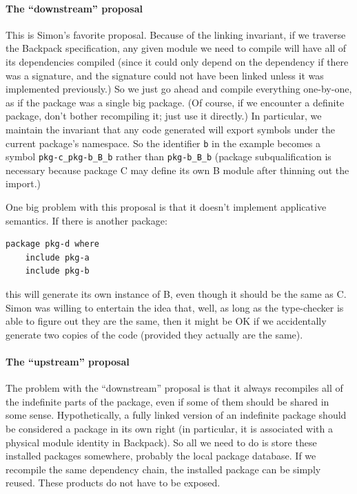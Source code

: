 \documentclass{article}
\begin{document}
\paragraph{The ``downstream'' proposal}  This is Simon's favorite
proposal.  Because of the linking invariant, if we traverse the Backpack
specification, any given module we need to compile will have all of its
dependencies compiled (since it could only depend on the dependency if
there was a signature, and the signature could not have been linked
unless it was implemented previously.)  So we just go ahead and compile
everything one-by-one, as if the package was a single big package.  (Of
course, if we encounter a definite package, don't bother recompiling
it; just use it directly.)  In
particular, we maintain the invariant that any code generated will
export symbols under the current package's namespace.  So the identifier
\verb|b| in the example becomes a symbol \verb|pkg-c_pkg-b_B_b| rather
than \verb|pkg-b_B_b| (package subqualification is necessary because
package C may define its own B module after thinning out the import.)

One big problem with this proposal is that it doesn't implement applicative
semantics.  If there is another package:

\begin{verbatim}
package pkg-d where
    include pkg-a
    include pkg-b
\end{verbatim}

this will generate its own instance of B, even though it should be the same
as C.  Simon was willing to entertain the idea that, well, as long as the
type-checker is able to figure out they are the same, then it might be OK
if we accidentally generate two copies of the code (provided they actually
are the same).

\paragraph{The ``upstream'' proposal}
The problem with the ``downstream'' proposal is that it always recompiles
all of the indefinite parts of the package, even if some of them should
be shared in some sense.  Hypothetically, a fully linked version of an
indefinite package should be considered a package in its own right
(in particular, it is associated with a physical module identity in Backpack).
So all we need to do is store these installed packages somewhere, probably
the local package database.  If we recompile the same dependency chain,
the installed package can be simply reused.  These products do not have
to be exposed.
\end{document}
